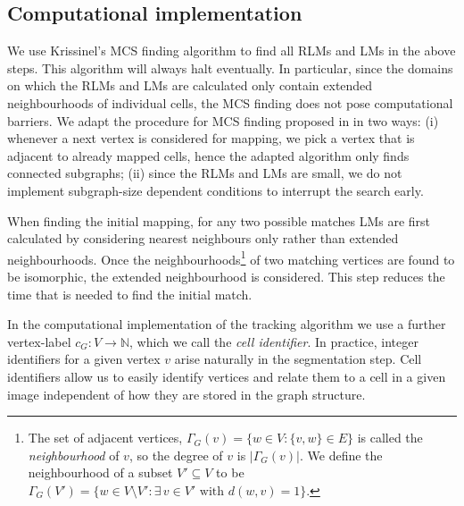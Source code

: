 \documentclass[a4paper,11pt]{article}
\begin{document}

\subsection*{Computational implementation}

We use Krissinel's MCS finding algorithm \cite{Krissinel2004} to find all RLMs and LMs in the above steps. This algorithm will always halt eventually. 
In particular, since the domains on which the RLMs and LMs are calculated only contain extended neighbourhoods of individual cells, the MCS finding does not pose computational barriers.
We adapt the procedure for MCS finding proposed in \cite{Krissinel2004} in two ways:
(i) whenever a next vertex is considered for mapping, we pick a vertex that is adjacent to already mapped cells, hence the adapted algorithm only finds connected subgraphs;
(ii) since the RLMs and LMs are small, we do not implement subgraph-size dependent conditions to interrupt the search early.

When finding the initial mapping, for any two possible matches LMs are first calculated by considering nearest neighbours only rather than extended neighbourhoods. 
Once the neighbourhoods\footnote{The set of adjacent vertices, $\Gamma_{G}(v) = \{w \in V : \{v, w \} \in E \}$ is called the \textit{neighbourhood} of $v$, so the degree of $v$ is $|\Gamma_{G}(v)|$.
We define the neighbourhood of a subset $V' \subseteq V$ to be $\Gamma_{G}(V') = \{w \in V \setminus V' : \exists \, v \in V' \text{ with } d(w,v) = 1 \}$.} of two matching vertices are found to be isomorphic, the extended neighbourhood is considered. 
This step reduces the time that is needed to find the initial match.

In the computational implementation of the tracking algorithm we use a further vertex-label $c_{G} : V \rightarrow \mathbb{N}$, which we call the \textit{cell identifier}. 
In practice, integer identifiers for a given vertex $v$ arise naturally in the segmentation step. 
Cell identifiers allow us to easily identify vertices and relate them to a cell in a given image independent of how they are stored in the graph structure. 

\end{document}

